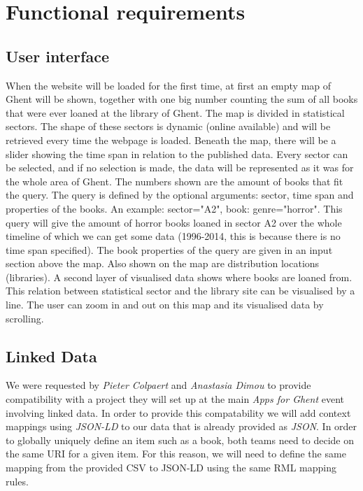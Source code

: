 \section{Functional requirements}

\subsection{User interface}

When the website will be loaded for the first time, at first an empty map of Ghent will be shown, together with one big number counting the sum of all books that were ever loaned at the library of Ghent. The map is divided in statistical sectors. The shape of these sectors is dynamic (online available) and will be retrieved every time the webpage is loaded. Beneath the map, there will be a slider showing the time span in relation to the published data. Every sector can be selected, and if no selection is made, the data will be represented as it was for the whole area of Ghent.  The numbers shown are the amount of books that fit the query. The query is defined by the optional arguments: sector, time span and properties of the books. An example: sector="A2", book: genre="horror". This query will give the amount of horror books loaned in sector A2 over the whole timeline of which we can get some data (1996-2014, this is because there is no time span specified). The book properties of the query are given in an input section above the map. Also shown on the map are distribution locations (libraries). A second layer of visualised data shows where books are loaned from. This relation between statistical sector and the library site can be visualised by a line. The user can zoom in and out on this map and its visualised data by scrolling.

\subsection{Linked Data}

We were requested by \emph{Pieter Colpaert} and \emph{Anastasia Dimou} to provide compatibility with a project they will set up at the main \emph{Apps for Ghent} event involving linked data. In order to provide this compatability we will add context mappings using \emph{JSON-LD} to our data that is already provided as \emph{JSON}. In order to globally uniquely define an item such as a book, both teams need to decide on the same URI for a given item. For this reason, we will need to define the same mapping from the provided CSV to JSON-LD using the same RML mapping rules.

